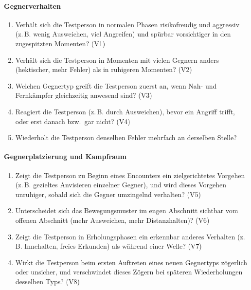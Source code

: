 \documentclass[../Main.tex]{subfiles}
\begin{document}
\paragraph{Gegnerverhalten}
\begin{enumerate}[label=\textbf{B\arabic*}, leftmargin=1.5cm, itemsep=0.5em]
    \item Verhält sich die Testperson in normalen Phasen risikofreudig und aggressiv (z.\,B. wenig Ausweichen, viel Angreifen) und spürbar vorsichtiger in den zugespitzten Momenten? \hfill (V1)
    \item Verhält sich die Testperson in Momenten mit vielen Gegnern anders (hektischer, mehr Fehler) als in ruhigeren Momenten? \hfill (V2)
    \item Welchen Gegnertyp greift die Testperson zuerst an, wenn Nah- und Fernkämpfer gleichzeitig anwesend sind? \hfill (V3)
    \item Reagiert die Testperson (z.\,B. durch Ausweichen), bevor ein Angriff trifft, oder erst danach bzw.\ gar nicht? \hfill (V4)
    \item Wiederholt die Testperson denselben Fehler mehrfach an derselben Stelle?
\end{enumerate}

\paragraph{Gegnerplatzierung und Kampfraum}
\begin{enumerate}[label=\textbf{B\arabic*}, leftmargin=1.5cm, itemsep=0.5em, resume]
    \item Zeigt die Testperson zu Beginn eines Encounters ein zielgerichtetes Vorgehen (z.\,B. gezieltes Anvisieren einzelner Gegner), und wird dieses Vorgehen unruhiger, sobald sich die Gegner umzingelnd verhalten? \hfill (V5)
    \item Unterscheidet sich das Bewegungsmuster im engen Abschnitt sichtbar vom offenen Abschnitt (mehr Ausweichen, mehr Distanzhalten)? \hfill (V6)
    \item Zeigt die Testperson in Erholungsphasen ein erkennbar anderes Verhalten (z.\,B. Innehalten, freies Erkunden) als während einer Welle? \hfill (V7)
    \item Wirkt die Testperson beim ersten Auftreten eines neuen Gegnertyps zögerlich oder unsicher, und verschwindet dieses Zögern bei späteren Wiederholungen desselben Typs? \hfill (V8)
\end{enumerate}
\end{document}

